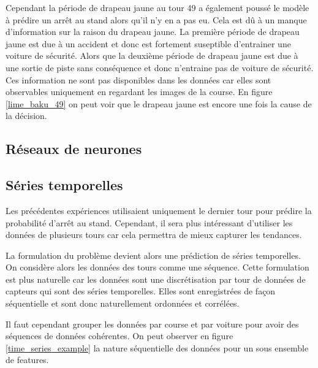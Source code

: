 Cependant la période de drapeau jaune au tour 49 a également poussé le modèle à prédire un arrêt au stand alors qu'il n'y en a pas eu.
Cela est dû à un manque d'information sur la raison du drapeau jaune. La première période de drapeau jaune est due à un accident et donc est fortement suseptible d'entrainer une voiture de sécurité.
Alors que la deuxième période de drapeau jaune est due à une sortie de piste sans conséquence et donc n'entraine pas de voiture de sécurité.
Ces information ne sont pas disponibles dans les données car elles sont observables uniquement en regardant les images de la course.
En figure \ref{lime_baku_49} on peut voir que le drapeau jaune est encore une fois la cause de la décision.

\subsection{Réseaux de neurones}


\subsection{Séries temporelles}

Les précédentes expériences utilisaient uniquement le dernier tour pour prédire la probabilité d'arrêt au stand.
Cependant, il sera plus intéressant d'utiliser les données de plusieurs tours car cela permettra de mieux capturer les tendances.

La formulation du problème devient alors une prédiction de séries temporelles.
On considère alors les données des tours comme une séquence.
Cette formulation est plus naturelle car les données sont une discrétisation par tour de données de capteurs qui sont des séries temporelles.
Elles sont enregistrées de façon séquentielle et sont donc naturellement ordonnées et corrélées.

Il faut cependant grouper les données par course et par voiture pour avoir des séquences de données cohérentes.
On peut observer en figure \ref{time_series_example} la nature séquentielle des données pour un sous ensemble de features.
